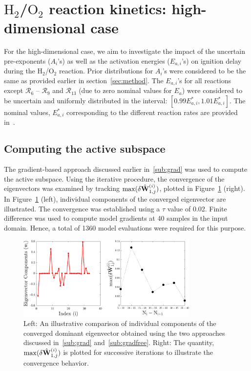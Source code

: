 \section{$\text{H}_2$/$\text{O}_2$ reaction kinetics: high-dimensional case}
\label{sec:app}

For the high-dimensional case, we aim to investigate the impact of the uncertain
pre-exponents ($A_i$'s) as well as the activation energies ($E_{a,i}$'s) on ignition 
delay during the H$_2$/O$_2$ reaction.  Prior distributions for $A_i$'s were considered
to be the same as provided earlier in section~\ref{sec:method}. The $E_{a,i}$'s for all
reactions except $\mathcal{R}_6$ -- $\mathcal{R}_9$ and $\mathcal{R}_{13}$ (due to 
zero nominal values for $E_a$)
were considered to be uncertain and uniformly distributed in the interval: 
$[0.99E_{a,i}^\ast, 1.01E_{a,i}^\ast]$. The nominal values, $E_{a,i}^\ast$
corresponding to the different reaction rates are provided in~\cite{Yetter:1991}. 

\subsection{Computing the active subspace}

The gradient-based approach discussed earlier in~\ref{sub:grad} was used to compute the
active subspace. Using the iterative procedure, the convergence of the eigenvectors
was examined by tracking $\max(\delta \hat{\mathbf{{W}}}_{1,j}^{(i)})$, plotted in 
Figure~\ref{fig:conv_app} (right). In Figure~\ref{fig:conv_app} (left), individual
components of the converged eigenvector are illustrated. The convergence was established using
a $\tau$ value of 0.02. Finite difference was used to compute model gradients at 40 samples in
the input domain. Hence, a total of 1360 model evaluations were required for this purpose.  
%
\begin{figure}[htbp]
 \begin{center}
  \includegraphics[width=0.8\textwidth]{./Figures/eigv10}
\caption{Left: An illustrative comparison of individual components of the converged dominant eigenvector obtained
using the two approaches discussed in~\ref{sub:grad} and~\ref{sub:gradfree}. Right: The quantity,  
$\max(\delta \hat{\mathbf{{W}}}_{1,j}^{(i)})$
is plotted for successive iterations to illustrate the convergence behavior.}
\label{fig:conv_app}
\end{center}
\end{figure}
%
 
